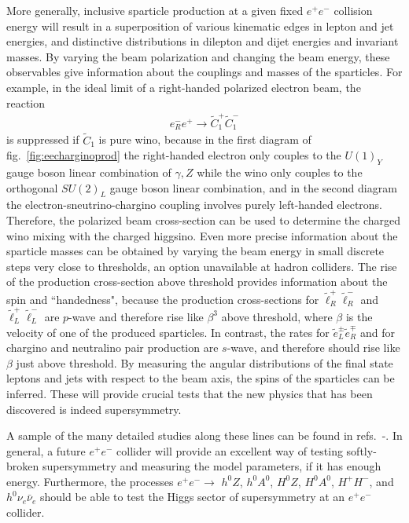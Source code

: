 \documentclass[11pt]{article}
\def\beq{\begin{eqnarray}}
\def\eeq{\end{eqnarray}}
\def\stilde{\widetilde}
\begin{document}
More generally, inclusive sparticle production at a given fixed $e^+e^-$ 
collision energy will result in a superposition of various kinematic 
edges in lepton and jet energies, and distinctive distributions in 
dilepton and dijet energies and invariant masses. By varying the beam 
polarization and changing the beam energy, these observables give 
information about the couplings and masses of the sparticles. For example, 
in the ideal limit of a right-handed polarized electron beam, the reaction
\beq
e^-_R e^+ \rightarrow \stilde C_1^+ \stilde C_1^-
\eeq
is suppressed if $\stilde C_1$ is pure wino, because in the first diagram 
of fig.~\ref{fig:eecharginoprod} the right-handed electron only couples to 
the $U(1)_Y$ gauge boson linear combination of $\gamma,Z$ while the wino 
only couples to the orthogonal $SU(2)_L$ gauge boson linear combination, 
and in the second diagram the electron-sneutrino-chargino coupling 
involves purely left-handed electrons. Therefore, the polarized beam 
cross-section can be used to determine the charged wino mixing with the 
charged higgsino. Even more precise information about the sparticle masses 
can be obtained by varying the beam energy in small discrete steps very 
close to thresholds, an option unavailable at hadron colliders. The rise 
of the production cross-section above threshold provides information about 
the spin and ``handedness", because the production cross-sections for 
$\tilde \ell_R^+ \tilde \ell_R^-$ and $\tilde \ell_L^+ \tilde \ell_L^-$ 
are $p$-wave and therefore rise like $\beta^3$ above threshold, where 
$\beta$ is the velocity of one of the produced sparticles. In contrast, 
the rates for $\tilde e_L^\pm \tilde e_R^\mp$ and for chargino and 
neutralino pair production are $s$-wave, and therefore should rise like 
$\beta$ just above threshold.  By measuring the angular distributions of 
the final state leptons and jets with respect to the beam axis, the spins 
of the sparticles can be inferred. These will provide crucial tests that 
the new physics that has been discovered is indeed supersymmetry.

A sample of the many detailed studies along these lines can be found in 
refs.~\cite{ilcmassdetrefs}-\cite{ALC}. 
In general, a future
$e^+ e^-$ collider will provide an excellent way of testing softly-broken 
supersymmetry and measuring the model parameters, if it has enough energy. 
Furthermore, the processes $e^+e^- \rightarrow$ $h^0Z$, $h^0A^0$, $H^0Z$, 
$H^0A^0$, $H^+H^-$, and $h^0 \nu_e \bar \nu_e$ should be able to 
test the Higgs sector of supersymmetry at an $e^+e^-$ collider.
\end{document}
